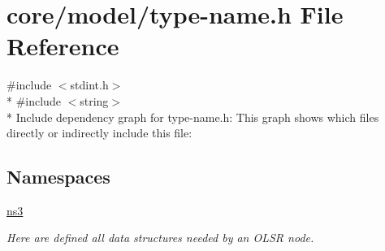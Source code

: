 \hypertarget{type-name_8h}{}\section{core/model/type-\/name.h File Reference}
\label{type-name_8h}
{\ttfamily \#include $<$stdint.\+h$>$}\\*
{\ttfamily \#include $<$string$>$}\\*
Include dependency graph for type-\/name.h\+:
This graph shows which files directly or indirectly include this file\+:
\subsection*{Namespaces}
\begin{DoxyCompactItemize}
\item 
 \hyperlink{namespacens3}{ns3}
\begin{DoxyCompactList}\small\item\em Here are defined all data structures needed by an O\+L\+SR node. \end{DoxyCompactList}\end{DoxyCompactItemize}
